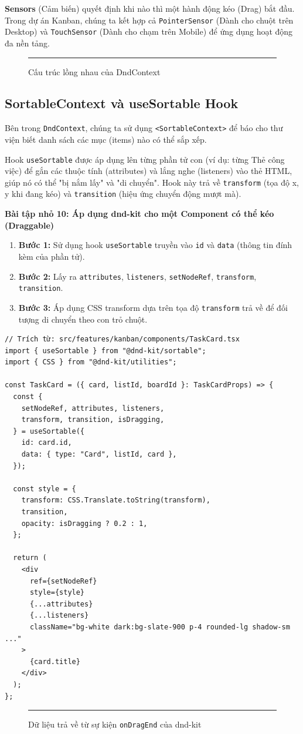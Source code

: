 \textbf{Sensors} (Cảm biến) quyết định khi nào thì một hành động kéo (Drag) bắt đầu. Trong dự án Kanban, chúng ta kết hợp cả \texttt{PointerSensor} (Dành cho chuột trên Desktop) và \texttt{TouchSensor} (Dành cho chạm trên Mobile) để ứng dụng hoạt động đa nền tảng.

\begin{figure}[H]
    \centering
    \rule{0.8\textwidth}{0.4\textwidth}
    \caption{Cấu trúc lồng nhau của DndContext}
\end{figure}

\subsection{SortableContext và useSortable Hook}
Bên trong \texttt{DndContext}, chúng ta sử dụng \texttt{<SortableContext>} để báo cho thư viện biết danh sách các mục (items) nào có thể sắp xếp.

Hook \texttt{useSortable} được áp dụng lên từng phần tử con (ví dụ: từng Thẻ công việc) để gắn các thuộc tính (attributes) và lắng nghe (listeners) vào thẻ HTML, giúp nó có thể "bị nắm lấy" và "di chuyển". Hook này trả về \texttt{transform} (tọa độ x, y khi đang kéo) và \texttt{transition} (hiệu ứng chuyển động mượt mà).

\textbf{Bài tập nhỏ 10: Áp dụng dnd-kit cho một Component có thể kéo (Draggable)}
\begin{enumerate}
    \item \textbf{Bước 1:} Sử dụng hook \texttt{useSortable} truyền vào \texttt{id} và \texttt{data} (thông tin đính kèm của phần tử).
    \item \textbf{Bước 2:} Lấy ra \texttt{attributes}, \texttt{listeners}, \texttt{setNodeRef}, \texttt{transform}, \texttt{transition}.
    \item \textbf{Bước 3:} Áp dụng CSS transform dựa trên tọa độ \texttt{transform} trả về để đối tượng di chuyển theo con trỏ chuột.
\end{enumerate}

\begin{Verbatim}
// Trích từ: src/features/kanban/components/TaskCard.tsx
import { useSortable } from "@dnd-kit/sortable";
import { CSS } from "@dnd-kit/utilities";

const TaskCard = ({ card, listId, boardId }: TaskCardProps) => {
  const {
    setNodeRef, attributes, listeners,
    transform, transition, isDragging,
  } = useSortable({
    id: card.id,
    data: { type: "Card", listId, card },
  });

  const style = {
    transform: CSS.Translate.toString(transform),
    transition,
    opacity: isDragging ? 0.2 : 1,
  };

  return (
    <div
      ref={setNodeRef}
      style={style}
      {...attributes}
      {...listeners}
      className="bg-white dark:bg-slate-900 p-4 rounded-lg shadow-sm ..."
    >
      {card.title}
    </div>
  );
};
\end{Verbatim}

\begin{figure}[H]
    \centering
    \rule{0.8\textwidth}{0.3\textwidth}
    \caption{Dữ liệu trả về từ sự kiện \texttt{onDragEnd} của dnd-kit}
\end{figure}

